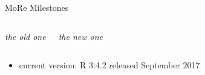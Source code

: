 \documentclass[t,12pt]{beamer}
\begin{document}
\begin{frame}{MoRe Milestones}
\begin{columns}
\end{columns}

\begin{columns}


\begin{center}
\textit{the old one}
\end{center}


\begin{center}
\textit{the new one}
\end{center}

\end{columns}

\vspace{0.5cm}

\begin{itemize}
   \item current version: R 3.4.2 released September 2017
\end{itemize}

\end{frame}

\end{document}
